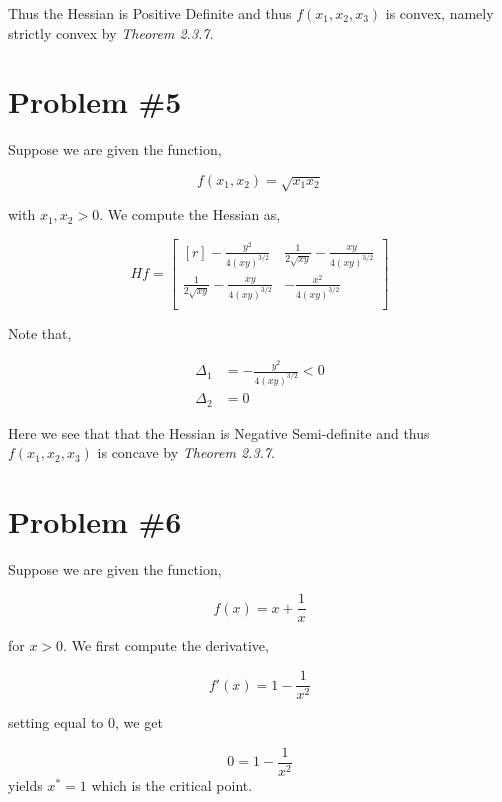 \documentclass{article}
\begin{document}
Thus the Hessian is Positive Definite and thus $f(x_1,x_2,x_3)$ is convex, namely strictly convex by \textit{Theorem 2.3.7}.

\section*{Problem \#5}
Suppose we are given the function,

\begin{equation*}
    f(x_1,x_2) = \sqrt{x_1x_2}
\end{equation*}

with $x_1,x_2 > 0$. We compute the Hessian as,

\begin{equation*}
   Hf = \begin{bmatrix*}[r]
       
 -\frac{y^2}{4 (x y)^{3/2}} & \frac{1}{2 \sqrt{x y}}-\frac{x y}{4 (x y)^{3/2}} \\
 \frac{1}{2 \sqrt{x y}}-\frac{x y}{4 (x y)^{3/2}} & -\frac{x^2}{4 (x y)^{3/2}} \\
\end{bmatrix*}
\end{equation*}

Note that,

\begin{align*}
    \Delta_1 &= -\frac{y^2}{4 (x y)^{3/2}} < 0 \\
    \Delta_2 &= 0 
\end{align*}

Here we see that that the Hessian is Negative Semi-definite and thus $f(x_1,x_2,x_3)$ is concave by \textit{Theorem 2.3.7}. 
\section*{Problem \#6}
Suppose we are given the function,

\begin{equation*}
    f(x) = x + \frac{1}{x}
\end{equation*}

for $x > 0$. We first compute the derivative,

\begin{equation*}
    f'(x) = 1 - \frac{1}{x^2}
\end{equation*}

setting equal to $0$, we get

\begin{equation*}
    0 =  1-\frac{1}{x^2}
\end{equation*}
yields $x^*=1$ which is the critical point.
\end{document}
